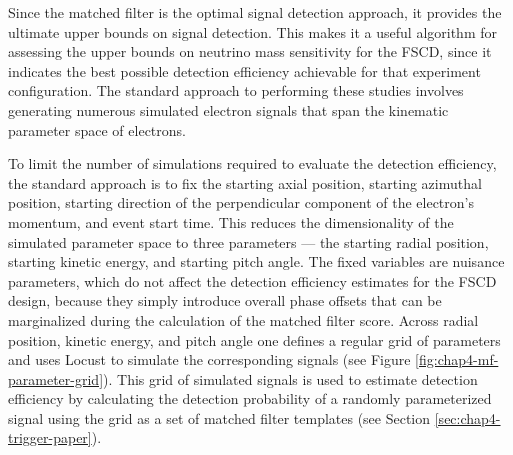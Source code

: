Since the matched filter is the optimal signal detection approach, it provides the ultimate upper bounds on signal detection. This makes it a useful algorithm for assessing the upper bounds on neutrino mass sensitivity for the FSCD, since it indicates the best possible detection efficiency achievable for that experiment configuration. The standard approach to performing these studies involves generating numerous simulated electron signals that span the kinematic parameter space of electrons.%

To limit the number of simulations required to evaluate the detection efficiency, the standard approach is to fix the starting axial position, starting azimuthal position, starting direction of the perpendicular component of the electron's momentum, and event start time. This reduces the dimensionality of the simulated parameter space to three parameters --- the starting radial position, starting kinetic energy, and starting pitch angle. The fixed variables are nuisance parameters, which do not affect the detection efficiency estimates for the FSCD design, because they simply introduce overall phase offsets that can be marginalized during the calculation of the matched filter score. Across radial position, kinetic energy, and pitch angle one defines a regular grid of parameters and uses Locust to simulate the corresponding signals (see Figure \ref{fig:chap4-mf-parameter-grid}). This grid of simulated signals is used to estimate detection efficiency by calculating the detection probability of a randomly parameterized signal using the grid as a set of matched filter templates (see Section \ref{sec:chap4-trigger-paper}).


